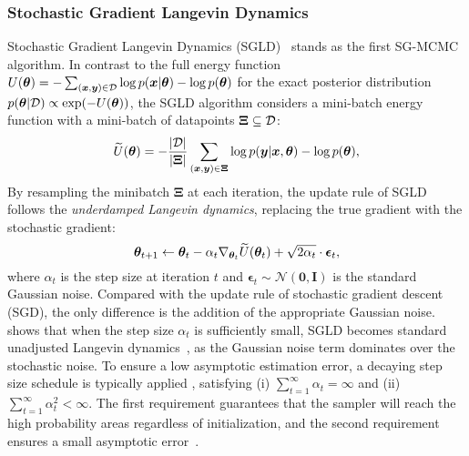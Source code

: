 \subsubsection{Stochastic Gradient Langevin Dynamics}
Stochastic Gradient Langevin Dynamics (SGLD)~\citep{welling2011bayesian} stands as the first SG-MCMC algorithm. In contrast to the full energy function $U(\bm{\theta})=-\sum_{(\bm{x}, \bm{y}) \in\mathcal{D}}\log{p(\bm{x}|\bm{\theta})}-\log{p(\bm{\theta})}$ for the exact posterior distribution $p(\bm{\theta}|\mathcal{D})\propto\exp(-U(\bm{\theta}))$, the SGLD algorithm considers a mini-batch energy function with a mini-batch of datapoints $\bm{\Xi}\subseteq\mathcal{D}$: 
\begin{equation}
    \widetilde{U}(\bm{\theta})=-\frac{|\mathcal{D}|}{|\bm{\Xi}|}\sum_{(\bm{x}, \bm{y})\in\bm{\Xi}}\log{p(\bm{y} | \bm{x}, \bm{\theta})}-\log{p(\bm{\theta})},
\end{equation}
By resampling the minibatch $\bm{\Xi}$ at each iteration, the update rule of SGLD follows the \emph{underdamped Langevin dynamics}, replacing the true gradient with the stochastic gradient:
\begin{equation}
    \bm{\theta}_{t+1} \gets \bm{\theta}_t-\alpha_t\nabla_{\bm{\theta}_t}\widetilde{U}(\bm{\theta}_t)+\sqrt{2\alpha_t}\cdot\bm{\epsilon}_t,
\end{equation}
where $\alpha_t$ is the step size at iteration $t$ and $\bm{\epsilon}_t\sim \mathcal{N}(\bm{0},\bm{I})$ is the standard Gaussian noise. Compared with the update rule of stochastic gradient descent (SGD), the only difference is the addition of the appropriate Gaussian noise.
\citet{welling2011bayesian} shows that when the step size $\alpha_t$
is sufficiently small, SGLD becomes standard unadjusted Langevin dynamics~\citep{roberts1996exponential}, as the Gaussian noise term dominates over the stochastic noise. To ensure a low asymptotic estimation error, a decaying step size schedule is typically applied \citep{bottou:ol1998,welling2011bayesian,ma2015complete}, satisfying (i) $\sum_{t=1}^\infty\alpha_t=\infty$ and (ii) $\sum_{t=1}^\infty\alpha_t^2<\infty$. The first requirement guarantees that the sampler will reach the high probability areas regardless of initialization, and the second requirement ensures a small asymptotic error~\citep{welling2011bayesian}.

